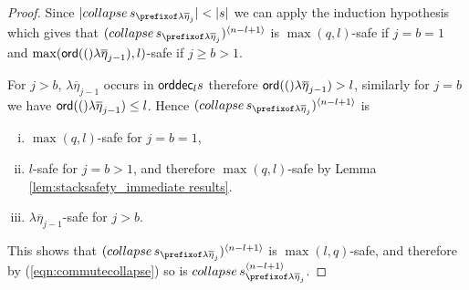 \documentclass[a4paper]{article}
\theoremstyle{remark}
\theoremstyle{definition}
\newcommand\orddec{{\sf orddec}}
\begin{document}
\begin{proof}
Since $|collapse\,s_{\prefixof \lambda\overline\eta_j}| < |s|$ we can apply the induction hypothesis which gives that
$(collapse\,s_{\prefixof \lambda\overline\eta_j})^{\langle n-l+1\rangle}$ is $\max(q,l)$-safe
if $j=b=1$ and $\max({\sf ord}(()\lambda\overline\eta_{j-1}),l)$-safe if $j\geq b>1$.

For $j>b$, $\lambda\overline\eta_{j-1}$ occurs in $\orddec_l s$ therefore ${\sf ord}(()\lambda\overline\eta_{j-1}) > l$,
similarly for $j=b$ we have ${\sf ord}(()\lambda\overline\eta_{j-1}) \leq l$.
Hence $(collapse\,s_{\prefixof \lambda\overline\eta_j})^{\langle n-l+1\rangle}$ is
\begin{enumerate}[(i)]
\item $\max(q,l)$-safe for $j=b=1$,
\item $l$-safe for $j=b>1$, and therefore $\max(q,l)$-safe by Lemma \ref{lem:stacksafety_immediate results}.
\item $\lambda\overline\eta_{j-1}$-safe for $j>b$.
\end{enumerate}
This shows that $(collapse\,s_{\prefixof \lambda\overline\eta_j})^{\langle n-l+1\rangle}$ is $\max(l,q)$-safe, and therefore by (\ref{eqn:commutecollapse})
so is $collapse\, s^{\langle n-l+1 \rangle}_{\prefixof \lambda \overline{\eta}_{j}}$.
\end{proof}
\end{document}

